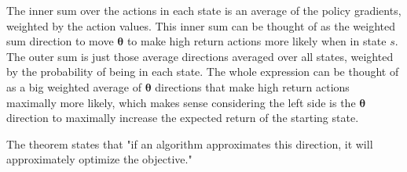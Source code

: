 \documentclass{article}
\begin{document}
The inner sum over the actions in each state is an average of the policy gradients, weighted by the action values.
This inner sum can be thought of as the weighted sum direction to move $\bm{\theta}$ to make high return actions more likely when in state $s$.
The outer sum is just those average directions averaged over all states, weighted by the probability of being in each state. The whole expression
can be thought of as a big weighted average of $\bm{\theta}$ directions that make high return actions maximally more likely, which makes sense 
considering the left side is the $\bm{\theta}$ direction to maximally increase the expected return of the starting state. 

The theorem states that "if an algorithm approximates this direction, it will approximately optimize the objective."
\end{document}
